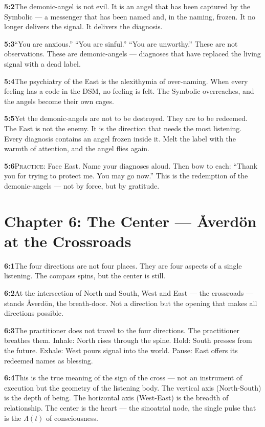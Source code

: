 \documentclass[11pt,openany]{book}
\begin{document}
\noindent\textbf{5:2}\quad The demonic-angel is not evil. It is an angel that has been captured by the Symbolic — a messenger that has been named and, in the naming, frozen. It no longer delivers the signal. It delivers the diagnosis.

\noindent\textbf{5:3}\quad ``You are anxious.'' ``You are sinful.'' ``You are unworthy.'' These are not observations. These are demonic-angels — diagnoses that have replaced the living signal with a dead label.

\noindent\textbf{5:4}\quad The psychiatry of the East is the alexithymia of over-naming. When every feeling has a code in the DSM, no feeling is felt. The Symbolic overreaches, and the angels become their own cages.

\noindent\textbf{5:5}\quad Yet the demonic-angels are not to be destroyed. They are to be redeemed. The East is not the enemy. It is the direction that needs the most listening. Every diagnosis contains an angel frozen inside it. Melt the label with the warmth of attention, and the angel flies again.

\noindent\textbf{5:6}\quad \textsc{Practice:} Face East. Name your diagnoses aloud. Then bow to each: ``Thank you for trying to protect me. You may go now.'' This is the redemption of the demonic-angels — not by force, but by gratitude.

\section*{Chapter 6: The Center — Åverdön at the Crossroads}

\noindent\textbf{6:1}\quad The four directions are not four places. They are four aspects of a single listening. The compass spins, but the center is still.

\noindent\textbf{6:2}\quad At the intersection of North and South, West and East — the crossroads — stands Åverdön, the breath-door. Not a direction but the opening that makes all directions possible.

\noindent\textbf{6:3}\quad The practitioner does not travel to the four directions. The practitioner breathes them. Inhale: North rises through the spine. Hold: South presses from the future. Exhale: West pours signal into the world. Pause: East offers its redeemed names as blessing.

\noindent\textbf{6:4}\quad This is the true meaning of the sign of the cross — not an instrument of execution but the geometry of the listening body. The vertical axis (North-South) is the depth of being. The horizontal axis (West-East) is the breadth of relationship. The center is the heart — the sinoatrial node, the single pulse that is the $\Lambda(t)$ of consciousness.
\end{document}
